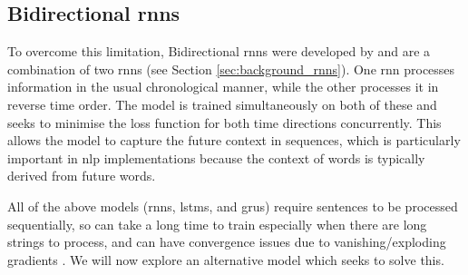 \subsection{Bidirectional \acrlong{rnn}s}\label{sec:background_bidirectional_rnns}
To overcome this limitation, Bidirectional \acrshort{rnn}s were developed by \citet{Schuster} and are a combination of two \acrshort{rnn}s (see Section \ref{sec:background_rnns}). One \acrshort{rnn} processes information in the usual chronological manner, while the other processes it in reverse time order. The model is trained simultaneously on both of these and seeks to minimise the loss function for both time directions concurrently. This allows the model to capture the future context in sequences, which is particularly important in \acrshort{nlp} implementations because the context of words is typically derived from future words.

All of the above models (\acrshort{rnn}s, \acrshort{lstm}s, and \acrshort{gru}s) require sentences to be processed sequentially, so can take a long time to train especially when there are long strings to process, and can have convergence issues due to vanishing/exploding gradients \citep{vaswani2017attention, Lipton}. We will now explore an alternative model which seeks to solve this.




